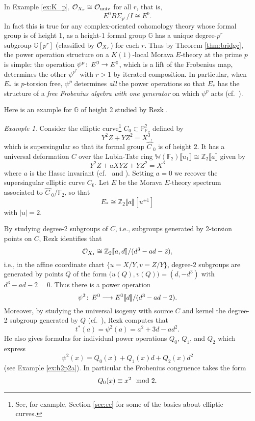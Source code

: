 \documentclass{gtpart}
\theoremstyle{definition}
\theoremstyle{remark}
\newtheorem{ex}[thm]{Example}
\def\co{\colon\thinspace}
\newcommand{\mb}[1]{\mathbb{#1}}
\newcommand{\CO}{{\cal O}}
\newcommand{\BF}{{\mb F}}
\newcommand{\BG}{{\mb G}}
\newcommand{\BP}{{\mb P}}
\newcommand{\BW}{{\mb W}}
\newcommand{\BZ}{{\mb Z}}
\newcommand{\HC}{\widehat{C~}\!}
\newcommand{\md}{~~{\rm mod}~}
\newcommand{\univ}{{\rm univ}}
\numberwithin{equation}{section}
\numberwithin{thm}{section}
\begin{document}
In Example \ref{ex:K_p}, $\CO_{X_r} \cong \CO_\univ$ for all $r$, that 
is, 
\[
 E^0 B\Sigma_{p^r}/I \cong E^0.  
\]
In fact this is true for any complex-oriented cohomology theory whose 
formal group is of height 1, as a height-1 formal group $\BG$ has a 
unique degree-$p^r$ subgroup $\BG [p^r]$ (classified by $\CO_{X_r}$) for 
each $r$.  Thus by Theorem \ref{thm:bridge}, the power operation 
structure on a $K(1)$-local Morava $E$-theory at the prime $p$ is simple: 
the operation $\psi^p \co E^0 \to E^0$, which is a lift of the Frobenius 
map, determines the other $\psi^{p^r}$ with $r>1$ by iterated 
composition.  In particular, when $E_*$ is $p$-torsion free, $\psi^p$ 
determines {\em all} the power operations so that $E_*$ has the 
structure of a {\em free Frobenius algebra with one generator} on which 
$\psi^p$ acts (cf.~\cite[Section 4]{hopkins}).  

Here is an example for $\BG$ of height 2 studied by Rezk \cite{h2p2}.  

\begin{ex}
\label{ex:h2p2b}
 Consider the elliptic curve\footnote{See, for example, Section 
 \ref{sec:ec} for some of the basics about elliptic curves.  } 
 $C_0 \subset \BP_{\BF_2}^2$ defined by 
 \[
  Y^2 Z + Y Z^2 = X^3, 
 \]
 which is supersingular so that its formal group $\HC_0$ is of height 2.  
 It has a universal deformation $C$ over the Lubin-Tate ring 
 $\BW(\BF_2) \llbracket u_1 \rrbracket \cong 
 \BZ_2 \llbracket a \rrbracket$ given by 
 \[
  Y^2 Z + a X Y Z + Y Z^2 = X^3 
 \]
 where $a$ is the Hasse invariant (cf.~\cite[Proposition 3.2]{tmf3} and 
 \cite[2.2.10]{KM}).  Setting $a=0$ we recover the supersingular 
 elliptic curve $C_0$.  Let $E$ be the Morava $E$-theory spectrum 
 associated to $\HC_0/\BF_2$, so that 
 \[
  E_* \cong \BZ_2 \llbracket a \rrbracket [u^{\pm 1}] 
 \]
 with $|u| = 2$.  

 By studying degree-2 subgroups of $C$, i.e., subgroups generated by 
 2-torsion points on $C$, Rezk identifies that 
 \[
  \CO_{X_1} \cong \BZ_2 \llbracket a, d \rrbracket / (d^3 - a d - 2), 
 \]
 i.e., in the affine coordinate chart $\{u = X/Y, v = Z/Y\}$, degree-2 
 subgroups are generated by points $Q$ of the form 
 $\big( u(Q), v(Q) \big) = (d, -d^3)$ with $d^3 - a d - 2 = 0$.  Thus 
 there is a power operation 
 \[
  \psi^2 \co E^0 \longrightarrow E^0 \llbracket d \rrbracket / 
  (d^3 - a d - 2).  
 \]
 Moreover, by studying the universal isogeny with source $C$ and kernel 
 the degree-2 subgroup generated by $Q$ (cf.~\cite[Theorem 1.4]{lubin}), 
 Rezk computes that 
 \[
  t^* (a) = \psi^2 (a) = a^2 + 3 d - a d^2.  
 \]
 He also gives formulas for individual power operations $Q_0$, $Q_1$, 
 and $Q_2$ which express 
 \[
  \psi^2 (x) = Q_0(x) + Q_1(x) d + Q_2(x) d^2 
 \]
 (see Example \ref{ex:h2p2a}).  In particular the Frobenius congruence 
 takes the form 
 \[
  Q_0(x) \equiv x^2 \md 2.  
 \]
\end{ex}
\end{document}
